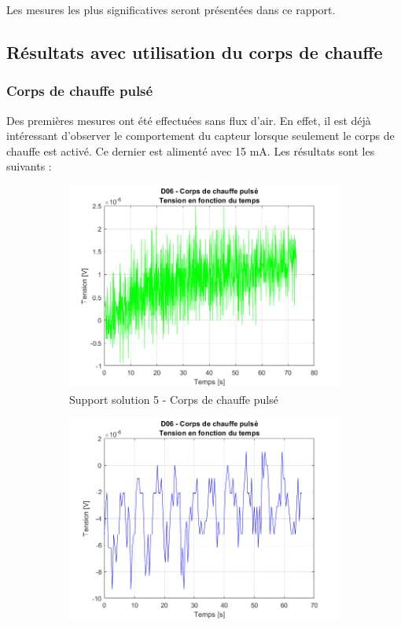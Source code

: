 Les mesures les plus significatives seront présentées dans ce rapport. \\

\subsection{Résultats avec utilisation du corps de chauffe}
\subsubsection{Corps de chauffe pulsé}
Des premières mesures ont été effectuées sans flux d'air. En effet, il est déjà intéressant d'observer le comportement du capteur
lorsque seulement le corps de chauffe est activé. Ce dernier est alimenté avec 15 mA. Les résultats sont les suivants :
\begin{figure}[H]
    \hspace{-0.5cm}
    \begin{subfigure}[b]{0.45\textwidth}
        \includegraphics[scale = 0.45]{assets/figures/D06_corps_chauffe_pulse_green.png}
        \caption{Support solution 5 - Corps de chauffe pulsé}
        \label{fig:chauffe_pulse_g}
    \end{subfigure}
    \begin{subfigure}[b]{0.45\textwidth}
        \includegraphics[scale = 0.45]{assets/figures/D06_corps_chauffe_pulse_blue.png}

\end{subfigure}
\end{figure}
